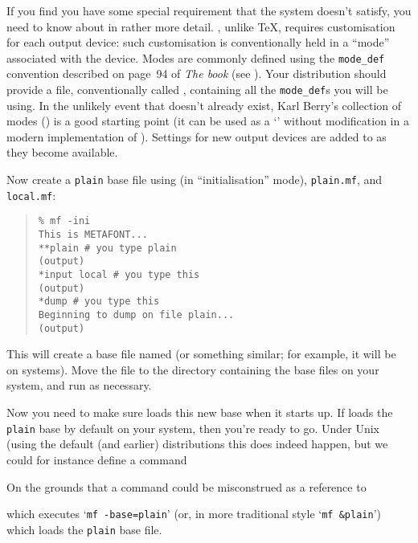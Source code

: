If you find you have some special requirement that the system doesn't
satisfy, you need to know about \MF{} in rather more detail.  \MF{},
unlike \TeX{}, requires customisation for each output device: such
customisation is conventionally held in a ``mode'' associated with the
device.  Modes are commonly defined using the \texttt{mode\_def}
convention described on page~94 of \emph{The \MF{}book} %
(see ).  Your
distribution should provide
a file, conventionally called , containing all the
\texttt{mode\_def}s you will be using. In the unlikely event that
 doesn't already exist, Karl Berry's collection of
modes () is a good starting point 
(it can be used as a `' without modification in a
modern implementation of \MF{}).  
Settings for new output devices are added to  as they
become available.

Now create
a \texttt{plain} base file using  (in ``initialisation''
mode), \texttt{plain.mf}, and \texttt{local.mf}: 
\begin{quote}
\begin{verbatim}
% mf -ini
This is METAFONT...
**plain # you type plain
(output)
*input local # you type this
(output)
*dump # you type this
Beginning to dump on file plain...
(output)
\end{verbatim}
\end{quote}
This will create a base file named  (or something
similar; for example, it will be  on \MSDOS{}
systems).  Move the file to the directory containing the base files on
your system, and run  as necessary.

Now you need to make sure \MF{} loads this new base when it starts up. If
\MF{} loads the \texttt{plain} base by default on your system, then you're
ready to go. Under Unix (using the default \texlive{} (and earlier)
distributions this does indeed happen, but we could for instance
define a command %
\begin{footnoteenv}
  On the grounds that a command  could be misconstrued
  as a reference to \plaintex{}
\end{footnoteenv}
which executes `\texttt{mf -base=plain}' (or, in more traditional
style `\texttt{mf \&plain}') which loads the \texttt{plain} base
file.

